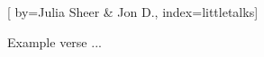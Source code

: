 
[%
    by={Julia Sheer \& Jon D.},
    index={littletalks}]


    \label{littletalks}

    \beginverse
        Example verse ...
    \endverse
\endsong
